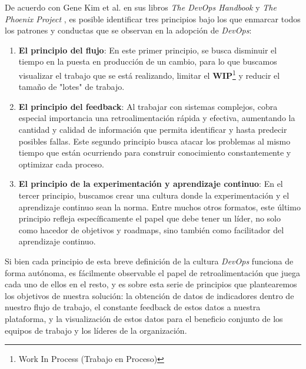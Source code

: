 \documentclass[journal]{IEEEtran}
\begin{document}
De acuerdo con Gene Kim et al. en sus libros \textit{The DevOps Handbook} \cite{kim2021devops} y \textit{The Phoenix Project} \cite{kim2018phoenix}, es posible identificar tres principios bajo los que enmarcar todos los patrones y conductas que se observan en la adopción de \textit{DevOps}:
\begin{enumerate}
    \item \textbf{El principio del flujo}\cite[Part 1.2: The First Way: The Principles of Flow]{kim2021devops}: En este primer principio, se busca disminuir el tiempo en la puesta en producción de un cambio, para lo que buscamos visualizar el trabajo que se está realizando, limitar el \textbf{WIP}\footnote{Work In Process (Trabajo en Proceso)} y reducir el tamaño de "lotes" de trabajo.
    \item \textbf{El principio del feedback}\cite[Part 1.3: The Second Way: The Principles of Feedback]{kim2021devops}: Al trabajar con sistemas complejos, cobra especial importancia una retroalimentación rápida y efectiva, aumentando la cantidad y calidad de información que permita identificar y hasta predecir posibles fallas. Este segundo principio busca atacar los problemas al mismo tiempo que están ocurriendo para construir conocimiento constantemente y optimizar cada proceso.
    \item \textbf{El principio de la experimentación y aprendizaje continuo}\cite[Part 1.4: The Third Way: The Principles of Continual Learning and Experimentation]{kim2021devops}: En el tercer principio, buscamos crear una cultura donde la experimentación y el aprendizaje continuo sean la norma. Entre muchos otros formatos, este último principio refleja específicamente el papel que debe tener un líder, no solo como hacedor de objetivos y roadmaps, sino también como facilitador del aprendizaje continuo.
\end{enumerate}

Si bien cada principio de esta breve definición de la cultura \textit{DevOps} funciona de forma autónoma, es fácilmente observable el papel de retroalimentación que juega cada uno de ellos en el resto, y es sobre esta serie de principios que plantearemos los objetivos de nuestra solución: la obtención de datos de indicadores dentro de nuestro flujo de trabajo, el constante feedback de estos datos a nuestra plataforma, y la visualización de estos datos para el beneficio conjunto de los equipos de trabajo y los líderes de la organización.
\end{document}
